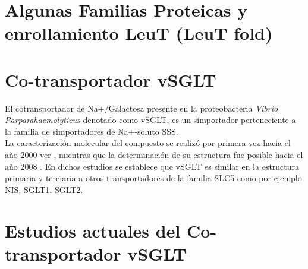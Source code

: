 \section{Algunas Familias Proteicas y enrollamiento LeuT (LeuT fold)}
\section{Co-transportador vSGLT}
El cotransportador de Na+/Galactosa presente en la proteobacteria \textit{Vibrio Parparahaemolyticus } denotado como vSGLT, es un simportador perteneciente a la familia de simportadores de Na$+$-soluto SSS.\\
La caracterizaci\'{o}n molecular del compuesto se realiz\'{o} por primera vez hacia el a\~{n}o 2000 ver \cite{Turk2000}, mientras que la determinaci\'{o}n de su estructura fue posible hacia el a\~{n}o 2008 \cite{Faham2008}. En dichos estudios se establece que vSGLT es similar en la estructura primaria y terciaria a otros transportadores de la familia SLC5 como por ejemplo NIS, SGLT1, SGLT2.
\section{Estudios actuales del Co-transportador vSGLT}
